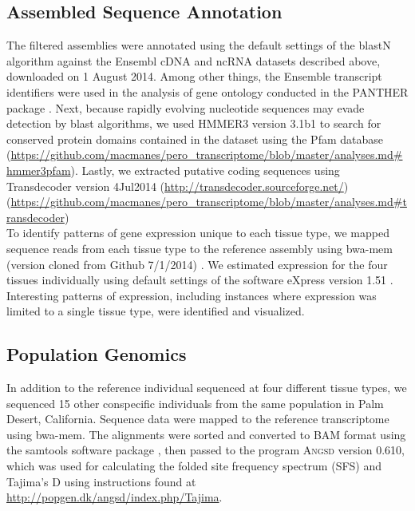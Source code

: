 \documentclass[12pt]{article}
\begin{document}
\subsection*{Assembled Sequence Annotation}



The filtered assemblies were annotated using the default settings of the blastN algorithm \citep{Camacho:2009fc} against the Ensembl cDNA and ncRNA datasets described above, downloaded on 1 August 2014. Among other things, the Ensemble transcript identifiers were used in the analysis of gene ontology conducted in the PANTHER package \citep{Mi:2004iv}. Next, because rapidly evolving nucleotide sequences may evade detection by blast algorithms, we used HMMER3 version 3.1b1 \citep{Wheeler:2013gj} to search for conserved protein domains contained in the dataset using the Pfam database \citep{Punta:2012ko} (\url{https://github.com/macmanes/pero_transcriptome/blob/master/analyses.md#hmmer3pfam}). Lastly, we extracted putative coding sequences using Transdecoder version 4Jul2014 (\url{http://transdecoder.sourceforge.net/}) (\url{https://github.com/macmanes/pero_transcriptome/blob/master/analyses.md#transdecoder})\\

To identify patterns of gene expression unique to each tissue type, we mapped sequence reads from each tissue type to the reference assembly using bwa-mem (version cloned from Github 7/1/2014)  \citep{Li:2013wn}. We estimated expression for the four tissues individually using default settings of the software eXpress version 1.51 \citep{Roberts:2012dh}. Interesting patterns of expression, including instances where expression was limited to a single tissue type, were identified and visualized. \\ 

\subsection*{Population Genomics}

In addition to the reference individual sequenced at four different tissue types, we sequenced 15 other conspecific individuals from the same population in Palm Desert, California. Sequence data were mapped to the reference transcriptome using bwa-mem. The alignments were sorted and converted to BAM format using the samtools software package \citep{Li:2009ka}, then passed to the program \textsc{Angsd} version 0.610, which was used for calculating the folded site frequency spectrum (SFS) and Tajima's D \citep{Korneliussen:2013uz} using instructions found at \url{http://popgen.dk/angsd/index.php/Tajima}. \\
\end{document}
